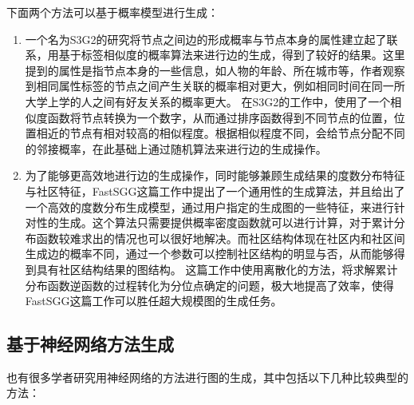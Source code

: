 下面两个方法可以基于概率模型进行生成：

\begin{enumerate}
  \item 一个名为S3G2\cite{Minh2012S3G2}的研究将节点之间边的形成概率与节点本身的属性建立起了联系，用基于标签相似度的概率算法来进行边的生成，得到了较好的结果。这里提到的属性是指节点本身的一些信息，如人物的年龄、所在城市等，作者观察到相同属性标签的节点之间产生关联的概率相对更大，例如相同时间在同一所大学上学的人之间有好友关系的概率更大。
  在S3G2的工作中，使用了一个相似度函数将节点转换为一个数字，从而通过排序函数得到不同节点的位置，位置相近的节点有相对较高的相似程度。根据相似程度不同，会给节点分配不同的邻接概率，在此基础上通过随机算法来进行边的生成操作。
  \item 为了能够更高效地进行边的生成操作，同时能够兼顾生成结果的度数分布特征与社区特征，FastSGG\cite{FastSGG}这篇工作中提出了一个通用性的生成算法，并且给出了一个高效的度数分布生成模型，通过用户指定的生成图的一些特征，来进行针对性的生成。这个算法只需要提供概率密度函数就可以进行计算，对于累计分布函数较难求出的情况也可以很好地解决。而社区结构体现在社区内和社区间生成边的概率不同，通过一个参数可以控制社区结构的明显与否，从而能够得到具有社区结构结果的图结构。
  这篇工作中使用离散化的方法，将求解累计分布函数逆函数的过程转化为分位点确定的问题，极大地提高了效率，使得FastSGG这篇工作可以胜任超大规模图的生成任务。
\end{enumerate}

\vspace{0.2cm}

\subsection{基于神经网络方法生成}

也有很多学者研究用神经网络的方法进行图的生成，其中包括以下几种比较典型的方法：

